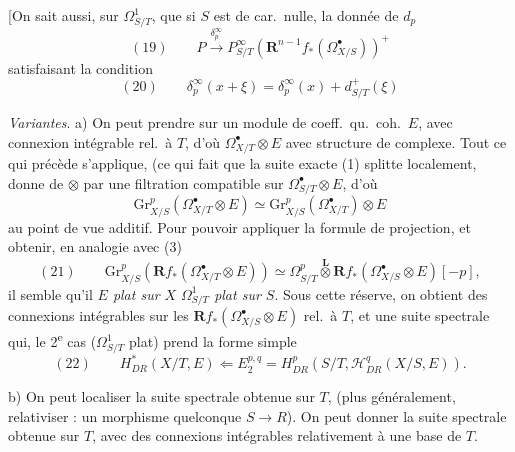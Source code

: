 \documentclass[11pt,a4paper]{article}
\begin{document}
[On sait aussi,     sur $\Omega^{1}_{S/T}$, que si $S$ est de car.\ nulle, la donnée de $d_{p}$     
\[
(19) \qquad P \xrightarrow{\delta^{\infty}_{p}} P^{\infty}_{S/T}(\mathbf{R}^{n-1}f_{*}(\Omega^{\bullet}_{X/S}))^{+}
\]
satisfaisant la condition
\[
(20) \qquad \delta^{\infty}_{p}(x+\xi) = \delta^{\infty}_{p}(x) + d^{+}_{S/T}(\xi)
\]
\struck{\ill{}}

\emph{Variantes}. a) On peut prendre sur  un module de coeff.\ qu.\ coh.\ $E$, avec connexion intégrable rel.\ à $T$, d'où $\Omega^{\bullet}_{X/T} \otimes E$ avec structure de complexe. Tout ce qui précède s'applique, (ce qui  fait que la suite exacte (1) splitte localement, donne  de $\otimes$ par une filtration compatible sur $\Omega^{\bullet}_{S/T} \otimes E$, d'où
\[
\mathrm{Gr}^{p}_{X/S}(\Omega^{\bullet}_{X/T} \otimes E) \simeq \mathrm{Gr}^{p}_{X/S}(\Omega^{\bullet}_{X/T}) \otimes E
\]
au point de vue additif. Pour pouvoir appliquer la formule de projection, et obtenir, en analogie avec (3)
\[
(21) \qquad \mathrm{Gr}^{p}_{X/S}(\mathbf{R}f_{*}(\Omega^{\bullet}_{X/T} \otimes E)) \simeq \Omega^{p}_{S/T} \overset{\mathbf{L}}{\otimes} \mathbf{R}f_{*}(\Omega^{\bullet}_{X/S} \otimes E)[-p] ,
\]
il semble qu'il   \emph{$E$ plat sur $X$}  \emph{$\Omega^{1}_{S/T}$ plat sur $S$}. Sous cette réserve, on obtient des connexions intégrables sur les \struck{\ill{}} $\mathbf{R}f_{*}(\Omega^{\bullet}_{X/S} \otimes E)$ rel.\ à $T$, et une suite spectrale qui,  le 2\textsuperscript{e} cas ($\Omega^{1}_{S/T}$ plat) prend la forme simple
\[
(22) \qquad H^{*}_{DR}(X/T, E) \Longleftarrow E^{p,q}_{2} = H^{p}_{DR}(S/T, \mathcal{H}^{q}_{DR}(X/S, E)) .
\]

b) On peut localiser la suite spectrale obtenue sur $T$, (plus généralement, relativiser : un morphisme quelconque $S \to R$). On peut donner    la suite spectrale obtenue sur $T$, \struck{\ill{}}  avec des connexions intégrables relativement à une base  de $T$.
\end{document}
